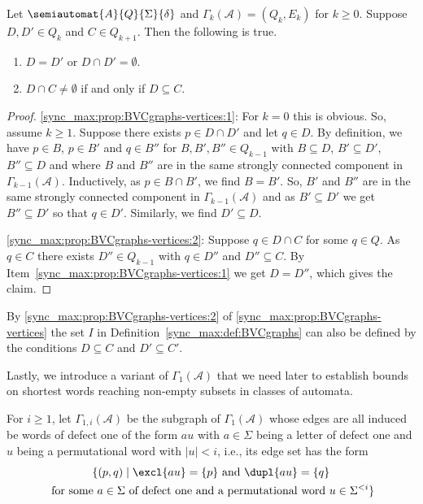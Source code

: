 \begin{proposition} \label{sync_max:prop:BVCgraphs-vertices}
Let $\semiautomat{A}{Q}{\Sigma}{\delta}$ and $\Gamma_k(\mathcal A) = (Q_k, E_k)$ for $k \ge 0$.
Suppose $D, D' \in Q_{k}$ and $C \in Q_{k+1}$.
Then the following is true.
	\begin{enumerate}
		\item \label{sync_max:prop:BVCgraphs-vertices:1} $D = D'$ or $D \cap D' = \emptyset$.		
		
		\item \label{sync_max:prop:BVCgraphs-vertices:2} $D \cap C \ne \emptyset$ if and only if $D \subseteq C$.
	\end{enumerate}
\end{proposition}
\begin{proof}
\ref{sync_max:prop:BVCgraphs-vertices:1}: For $k = 0$ this is obvious. So, assume $k \ge 1$.
	Suppose there exists $p \in D \cap D'$ %
	and let $q \in D$.
	By definition, we have $p \in B$, $p \in B'$
	and $q \in B''$ for $B, B', B'' \in Q_{k-1}$ with 
	$B \subseteq D$, $B' \subseteq D'$, $B'' \subseteq D$
	and where $B$ and $B''$ are in the same strongly connected component in $\Gamma_{k-1}(\mathcal A)$.
	Inductively, as $p \in B \cap B'$,
	we find $B = B'$.
	So, $B'$ and $B''$ are in the same strongly connected component in $\Gamma_{k-1}(\mathcal A)$
	and as $B' \subseteq D'$ we get $B'' \subseteq D'$
	so that $q \in D'$.
	Similarly, we find $D' \subseteq D$.	
	
\ref{sync_max:prop:BVCgraphs-vertices:2}: Suppose $q \in D \cap C$ for some $q \in Q$.
	As $q \in C$ there exists $D'' \in Q_{k-1}$
	with $q \in D''$ and $D'' \subseteq C$.
	By Item~\ref{sync_max:prop:BVCgraphs-vertices:1} we get $D = D''$, which gives the claim.	
\end{proof}

By \cref{sync_max:prop:BVCgraphs-vertices:2} of \cref{sync_max:prop:BVCgraphs-vertices}
the set $I$ in Definition~\ref{sync_max:def:BVCgraphs} 
can also be defined by the conditions $D \subseteq C$ and $D' \subseteq C'$.

Lastly, we introduce a variant of $\Gamma_1(\mathcal A)$ that we need later to establish bounds on shortest
words reaching non-empty subsets in classes of automata.

\label{def:Gamma1i-graph}
For $i \ge 1$, let $\Gamma_{1,i}(\mathcal A)$ be the subgraph of $\Gamma_1(\mathcal A)$
whose edges are all induced be words of defect one of the form $au$
with $a \in \Sigma$ being a letter of defect one and $u$ being a permutational word
with $|u| < i$, i.e., its edge set has the form
\begin{multline*}
\{ (p,q) \mid \excl{au} = \{p\} \text{ and }  \dupl{au} = \{q\} \\ 
\text{ for some $a \in \Sigma$ of defect one and a permutational word $u \in \Sigma^{< i}$} \}
\end{multline*}

